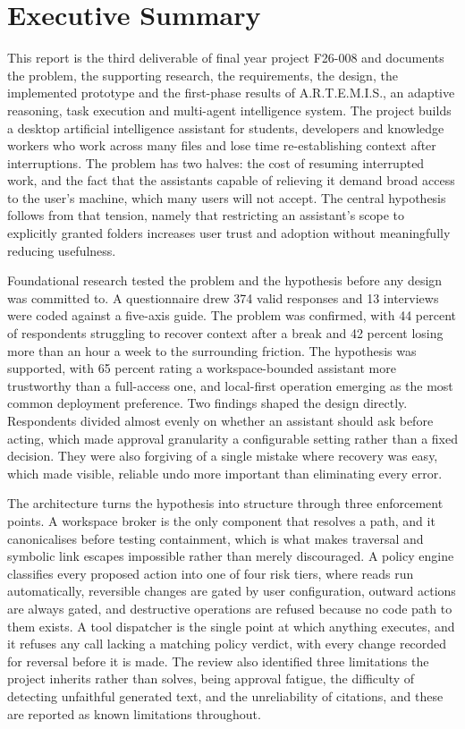 \documentclass{FastFyp}
\begin{document}
\section*{Executive Summary}
This report is the third deliverable of final year project F26-008 and documents the problem, the supporting research, the requirements, the design, the implemented prototype and the first-phase results of A.R.T.E.M.I.S., an adaptive reasoning, task execution and multi-agent intelligence system. The project builds a desktop artificial intelligence assistant for students, developers and knowledge workers who work across many files and lose time re-establishing context after interruptions. The problem has two halves: the cost of resuming interrupted work, and the fact that the assistants capable of relieving it demand broad access to the user's machine, which many users will not accept. The central hypothesis follows from that tension, namely that restricting an assistant's scope to explicitly granted folders increases user trust and adoption without meaningfully reducing usefulness.

Foundational research tested the problem and the hypothesis before any design was committed to. A questionnaire drew 374 valid responses and 13 interviews were coded against a five-axis guide. The problem was confirmed, with 44 percent of respondents struggling to recover context after a break and 42 percent losing more than an hour a week to the surrounding friction. The hypothesis was supported, with 65 percent rating a workspace-bounded assistant more trustworthy than a full-access one, and local-first operation emerging as the most common deployment preference. Two findings shaped the design directly. Respondents divided almost evenly on whether an assistant should ask before acting, which made approval granularity a configurable setting rather than a fixed decision. They were also forgiving of a single mistake where recovery was easy, which made visible, reliable undo more important than eliminating every error.

The architecture turns the hypothesis into structure through three enforcement points. A workspace broker is the only component that resolves a path, and it canonicalises before testing containment, which is what makes traversal and symbolic link escapes impossible rather than merely discouraged. A policy engine classifies every proposed action into one of four risk tiers, where reads run automatically, reversible changes are gated by user configuration, outward actions are always gated, and destructive operations are refused because no code path to them exists. A tool dispatcher is the single point at which anything executes, and it refuses any call lacking a matching policy verdict, with every change recorded for reversal before it is made. The review also identified three limitations the project inherits rather than solves, being approval fatigue, the difficulty of detecting unfaithful generated text, and the unreliability of citations, and these are reported as known limitations throughout.
\end{document}
